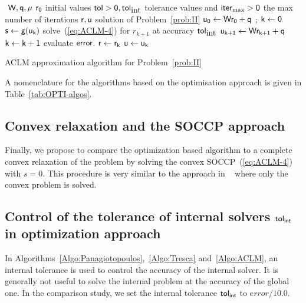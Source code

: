 \begin{algorithm}
  \begin{algorithmic}
    {\sf
      \STATE $ $ 
      \REQUIRE $\sf W,q,\mu$
      \REQUIRE $\sf r_0$ initial values
      \REQUIRE $\sf tol >0, tol_{\mbox{int}}$  tolerance values and $\sf iter_{\max}  >0$ the max number of iterations
      \ENSURE  $\sf r,u$ solution of Problem~\ref{prob:II}
      \STATE $\sf u_{0} \leftarrow W r_0 + q $ ; $\sf k \leftarrow 0$ 
      \STATE $\sf s \leftarrow g(u_{k})$ 
      \STATE solve~(\ref{eq:ACLM-4}) for $r_{k+1}$ at accuracy $\sf tol_{\mbox{int}}$
      \STATE $\sf u_{k+1} \leftarrow W r_{k+1} + q$ 
      \STATE $\sf k \leftarrow k+1$
      \STATE evaluate $\sf error$.
      \ENDWHILE
      \STATE $\sf r \leftarrow r_{k}$ 
      \STATE $\sf u \leftarrow u_k$ 
    }
  \end{algorithmic}
  \caption{ACLM approximation algorithm for Problem~\ref{prob:II}}
  \label{Algo:ACLM}
\end{algorithm}

A nomenclature for the algorithms based on the optimisation approach is given in Table~\ref{tab:OPTI-algos}.
\subsection{Convex relaxation and the SOCCP approach}

Finally, we propose to compare the optimization based algorithm to a complete convex relaxation of the problem by solving the convex SOCCP~(\ref{eq:ACLM-4}) with $s=0$. This procedure is very similar to the approach in ~\cite{Tasora.Anistescu_CMAME2009,Anistescu.Tasora_COA2010,Tasora.Anistescu_CMAME2011} where only the convex problem is  solved.


\subsection{Control of the tolerance of internal solvers $\sf tol_{{int}}$ in optimization approach}

In Algorithms~\ref{Algo:Panagiotopoulos},~\ref{Algo:Tresca} and~\ref{Algo:ACLM}, an internal tolerance is used to control the accuracy of the internal solver. It is generally not useful to solve the internal problem at the accuracy of the global one. In the comparison study, we set the internal tolerance $\sf tol_{{int}}$ to $error/10.0$.

